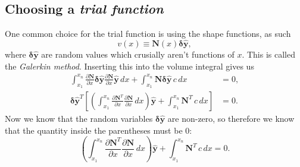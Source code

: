 \documentclass[acmtog]{acmart}
\begin{document}
\subsection{Choosing a \textit{trial function}}
One common choice for the trial function is using the shape functions, as such
%
\begin{equation}
  v(x) \equiv \boldsymbol N(x) \boldsymbol {\delta\hat{y}},
\end{equation}
%
where $\boldsymbol{\delta \hat{y}}$ are random values which crusially aren't functions of $x$. This is called the \textit{Galerkin method}. Inserting this into the volume integral gives us
%
\begin{align}
  \int_{x_1}^{x_n} \frac{ \partial \boldsymbol N }{ \partial x } \boldsymbol {\delta \hat{y}} \frac{ \partial \boldsymbol N}{ \partial x } \boldsymbol {\hat{y}} \, dx + \int_{x_1}^{x_n} \boldsymbol N \boldsymbol {\delta \hat{y}} \, c \, dx      & = 0, \\
  \boldsymbol {\delta \hat{y}}^T\left[\left(  \int_{x_1}^{x_n} \frac{ \partial \boldsymbol N^T }{ \partial x } \frac{ \partial \boldsymbol N}{ \partial x } \, dx \right) \boldsymbol {\hat{y}} + \int_{x_1}^{x_n} \boldsymbol N^T\, c \, dx \right] & = 0.
\end{align}
%
Now we know that the random variables $\boldsymbol{\delta \hat{y}}$ are
non-zero, so therefore we know that the quantity inside the parentheses must be
0:
%
\begin{equation}
  \left(  \int_{x_1}^{x_n} \frac{ \partial \boldsymbol N^T }{ \partial x } \frac{ \partial \boldsymbol N}{ \partial x } \, dx \right) \boldsymbol {\hat{y}} + \int_{x_1}^{x_n} \boldsymbol N^T\, c \, dx = 0.
\end{equation}
%
\end{document}
